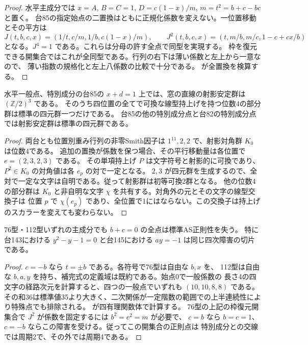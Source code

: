 \begin{proof}
水平主成分では $x=A$, $B=C=1$, $D=c(1-x)/m$, $m=t^2=b+c-bc$ と置く。
台85の指定始点の二置換はともに正規化係数を変えない。一位置移動とその平方は
\[
 J(t,b,c,x)=(1/t,c/m,1/b,c(1-x)/m),\qquad
 J^2(t,b,c,x)=(t,m/b,m/c,1-c+cx/b)
\]
となる。$J^4=1$ である。これらは分母の許す全点で同型を実現する。
枠を復元できる開集合ではこれが全同型である。行列の右下は薄い係数と左上から一意なので、
薄い指数の規格化と左上八係数の比較で十分である。
 が全置換を検算する。
\end{proof}

\begin{proposition}
水平一般点、特別成分の台85の $x+d=1$ 上では、窓の直線の射影安定群は $(\mathbb Z/2)^3$ である。
そのうち四位置の全てで可換な線型持上げを持つ位数4の部分群は標準の四元群一つだけである。
台85の他の特別成分点と台82の特別成分点では射影安定群は標準の四元群である。
\end{proposition}
\begin{proof}
両台とも位置別重み行列の非零Smith因子は $1^{11},2,2$ で、射影対角群 $K_0$ は位数4である。
追加の置換が係数を保つ場合、その平行移動量は各位置で $e=(2,3,2,3)$ である。
その単項持上げ $P$ は文字符号と射影的に可換であり、$P^2\in K_0$ の対角値は各 $e_p$ の対で一定となる。
$2,3$ が四元群を生成するので、全対で一定な文字は自明である。従って射影群は初等可換2群となる。
他の位数4の部分群は $K_0$ と非自明な文字 $\chi$ を共有する。対角外の元とその文字の線型交換子は
位置 $p$ で $\chi(e_p)$ であり、全位置で1にはならない。この交換子は持上げのスカラーを変えても変わらない。
\end{proof}

\begin{proposition}\label{prop:parallel-antidiagonal-obstruction}
76型・112型いずれの主成分でも $b+c=0$ の全点は標準AS正則性を失う。
特に台143における $y^2-y-1=0$ と台145における $ay=-1$ は同じ四次障害の切片である。
\end{proposition}
\begin{proof}
$c=-b$ なら $t=\pm b$ である。各符号で76型は自由な $b,x$ を、
112型は自由な $b,a,y$ を持ち、補完式の定義域は既約である。始点0で一般係数の
長さ4の四文字の経路次元を計算すると、四つの一般点でいずれも $(10,10,8,8)$ である。
その和36は標準値35より大きく、二次関係が一定階数の範囲での上半連続性により特殊点でも排除される。
 が四有理関数体で計算する。
76型の上記の枠復元開集合で $J^2$ が係数を固定するには $b^2=c^2=m$ が必要で、
$c=b$ なら $b=c=1$、$c=-b$ ならこの障害を受ける。従ってこの開集合の正則点は
特別成分との交線では周期2で、その外では周期4である。
\end{proof}
